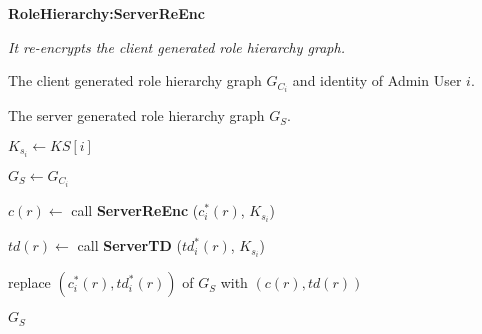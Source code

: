 \documentclass[epsfig,a4paper,11pt,titlepage]{book}
\numberwithin{algorithm}{chapter}
\newcommand{\algofontsize}{\fontsize{11}{12}\selectfont}
\begin{document}
\begin{algorithm} [htp]
{\algofontsize
\caption{\textbf{RoleHierarchy:ServerReEnc}}

\label{algo:erbac-deploy-role-hierarchy-server-side}

\begin{algorithmic}[1]

\INPUT \emph{It re-encrypts the client generated role hierarchy graph.}

\Require The client generated role hierarchy graph $G_{C_i}$ and identity of Admin User $i$.

\Ensure The server generated role hierarchy graph $G_{S}$.

\medskip

\State $K_{s_i} \leftarrow KS[i]$ {\algofontsize {}} \label{line:erbac-deploy-rh-ss-ks}

\State $G_{S} \leftarrow G_{C_i}$ \label{line:erbac-deploy-rh-ss-copy}

 \label{line:erbac-deploy-rh-ss-loop}

	\State $c(r) \leftarrow$ call \textbf{ServerReEnc} ($c^*_i (r)$, $K_{s_i}$) \label{line:erbac-deploy-rh-ss-enc}
	
	\State $td(r) \leftarrow$ call \textbf{ServerTD} ($td^*_i (r)$, $K_{s_i}$) {\algofontsize {}} \label{line:erbac-deploy-rh-ss-td}
	
	\State replace $(c^*_i (r), td^*_i (r))$ of $G_{S}$ with $(c(r), td(r))$ \label{line:erbac-deploy-rh-ss-replace}

\EndFor

\Return $G_{S}$

\end{algorithmic}
}
\end{algorithm}
\end{document}
